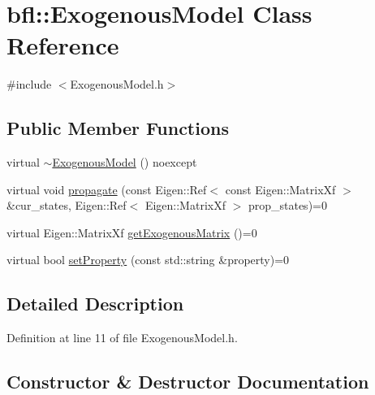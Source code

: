 \hypertarget{classbfl_1_1ExogenousModel}{}\section{bfl\+:\+:Exogenous\+Model Class Reference}
\label{classbfl_1_1ExogenousModel}


{\ttfamily \#include $<$Exogenous\+Model.\+h$>$}

\subsection*{Public Member Functions}
\begin{DoxyCompactItemize}
\item 
virtual \mbox{\hyperlink{classbfl_1_1ExogenousModel_a5d49c4215e05363a149e794bd69e7f1a}{$\sim$\+Exogenous\+Model}} () noexcept
\item 
virtual void \mbox{\hyperlink{classbfl_1_1ExogenousModel_a68255da5e3cdde0c57effd3b8e68cadb}{propagate}} (const Eigen\+::\+Ref$<$ const Eigen\+::\+Matrix\+Xf $>$ \&cur\+\_\+states, Eigen\+::\+Ref$<$ Eigen\+::\+Matrix\+Xf $>$ prop\+\_\+states)=0
\item 
virtual Eigen\+::\+Matrix\+Xf \mbox{\hyperlink{classbfl_1_1ExogenousModel_a3b4ab9b6b19e7e8552101cc8f8bf06f2}{get\+Exogenous\+Matrix}} ()=0
\item 
virtual bool \mbox{\hyperlink{classbfl_1_1ExogenousModel_a240432e20121e83787c83de64360a58a}{set\+Property}} (const std\+::string \&property)=0
\end{DoxyCompactItemize}


\subsection{Detailed Description}


Definition at line 11 of file Exogenous\+Model.\+h.



\subsection{Constructor \& Destructor Documentation}
\mbox{\label{classbfl_1_1ExogenousModel_a5d49c4215e05363a149e794bd69e7f1a}} 
